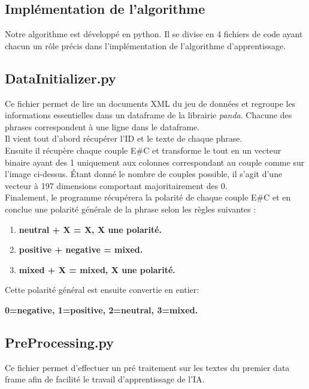 \documentclass[12pt ,a4paper ]{article}
\begin{document}
\begin{multicols}{2}
\newpage
\section{Implémentation de l'algorithme}
Notre algorithme est développé en python. Il se divise en 4 fichiers de code ayant chacun un rôle précis dans l'implémentation de l'algorithme d'apprentissage. 

\subsection{DataInitializer.py}
Ce fichier permet de lire un documents XML du jeu de données et regroupe les informations essentielles dans un dataframe de la librairie \textit{panda}. Chacune des phrases correspondent à une ligne dans le dataframe. \\

\noindent Il vient tout d'abord récupérer l'ID et le texte de chaque phrase. \\

\noindent Ensuite il récupère chaque couple E\#C et transforme le tout en un vecteur binaire ayant des 1 uniquement aux colonnes correspondant au couple comme sur l'image ci-dessus. Étant donné le nombre de couples possible, il s'agit d'une vecteur à 197 dimensions comportant majoritairement des 0.\\

\noindent Finalement, le programme récupérera la polarité de chaque couple E\#C et en conclue une polarité générale de la phrase selon les règles suivantes :
\begin{enumerate}
\item \textbf{\small{neutral + X = X, X une polarité. }}
\item \textbf{\small{positive + negative = mixed.}}
\item \textbf{\small{mixed + X = mixed, X une polarité.}}
\end{enumerate}

\noindent Cette polarité général est ensuite convertie en entier:

\noindent \textbf{0=negative, 1=positive, 2=neutral, 3=mixed.}

\subsection{PreProcessing.py}
Ce fichier permet d'effectuer un pré traitement sur les textes du premier data frame afin de facilité le travail d'apprentissage de l'IA.\\


\end{multicols}
\end{document}
